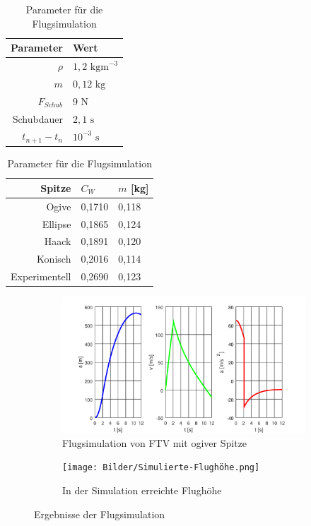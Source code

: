 \documentclass[10pt,a4paper]{article}
\begin{document}
\begin{table}[h]
\caption{Parameter für die Flugsimulation}
\begin{subtable}[l]{.49\textwidth}
	\begin{tabular}{r|l}
	\toprule
	Parameter	& Wert		\\
	\midrule
	$\rho$ 		& $1,2 \text{ kgm}^{-3}$ \\
	$m$			& $0,12 \text{ kg}$ \\
	$F_{Schub}$	& $9 \text{ N}$ \\
	Schubdauer	& $2,1 \text{ s}$ \\
	$t_{n+1}-t_{n}$ & $10^{-3} \text{ s}$ \\
	\bottomrule
	\end{tabular}
\end{subtable}
\begin{subtable}[l]{.49\textwidth}
	\label{tab-Simulationsparameter}
	\begin{tabular}{r|ll}
	\toprule
	Spitze			& $C_{W}$		& $m$ [kg]	\\
	\midrule
	Ogive			& 0,1710	& 0,118 \\
	Ellipse			& 0,1865	& 0,124 \\
	Haack			& 0,1891	& 0,120 \\
	Konisch			& 0,2016	& 0,114 \\
	Experimentell	& 0,2690	& 0,123 \\
	\bottomrule
	\end{tabular}
\end{subtable}
\end{table}

\begin{figure}
\begin{subfigure}[l]{0.49\textwidth}
	\centering
	\includegraphics[width=\textwidth]{Bilder/Flugsimulation.png}
	\caption{Flugsimulation von FTV mit ogiver Spitze}
	\label{sfig-Flugsimulation}
\end{subfigure}
\begin{subfigure}[r]{0.49\textwidth}
	\centering
	\texttt{[image: Bilder/Simulierte-Flughöhe.png]}
	\caption{In der Simulation erreichte Flughöhe}
	\label{sfig-Simulierte-Flughöhe}
\end{subfigure}
\caption{Ergebnisse der Flugsimulation}
\end{figure}
\end{document}
